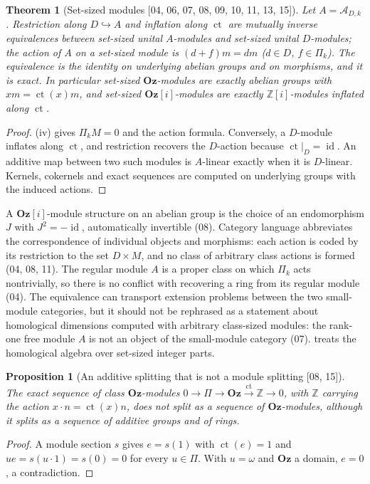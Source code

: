 \documentclass[11pt,letterpaper]{article}
\numberwithin{equation}{section}
\newtheorem{theorem}{Theorem}[section]
\newtheorem{proposition}[proposition]{Proposition}
\theoremstyle{definition}
\theoremstyle{remark}
\theoremstyle{plain}
\newcommand{\Oz}{\mathbf{Oz}}
\newcommand{\GOz}{\Oz[i]}
\newcommand{\Z}{\mathbb Z}
\newcommand{\A}{\mathcal A}          %
\newcommand{\ct}{\operatorname{ct}}
\newcommand{\id}{\operatorname{id}}
\newcommand{\src}[1]{\textup{\textsf{[#1]}}}
\begin{document}
\begin{theorem}[Set-sized modules \src{04, 06, 07, 08, 09, 10, 11, 13, 15}]\label{osq:thm:modules}
Let $A=\A_{D,k}$. Restriction along $D\hookrightarrow A$ and inflation along $\ct$ are mutually
inverse equivalences between set-sized unital $A$-modules and set-sized unital $D$-modules;
the action of $A$ on a set-sized module is $(d+f)m=dm$ ($d\in D$, $f\in\Pi_k$). The
equivalence is the identity on underlying abelian groups and on morphisms, and it is exact.
In particular set-sized $\Oz$-modules are exactly abelian groups with $xm=\ct(x)m$, and
set-sized $\GOz$-modules are exactly $\Z[i]$-modules inflated along $\ct$.
\end{theorem}
\begin{proof}
(iv) gives $\Pi_kM=0$ and the action formula. Conversely, a
$D$-module inflates along $\ct$, and restriction recovers the $D$-action because
$\ct|_D=\id$. An additive map between two such modules is $A$-linear exactly when it is
$D$-linear. Kernels, cokernels and exact sequences are computed on underlying groups with
the induced actions.
\end{proof}

A $\GOz$-module structure on an abelian group is the choice of an endomorphism $J$ with
$J^2=-\id$, automatically invertible (08). Category language abbreviates the correspondence
of individual objects and morphisms: each action is coded by its restriction to the set
$D\times M$, and no class of arbitrary class actions is formed (04, 08, 11). The regular
module $A$ is a proper class on which $\Pi_k$ acts nontrivially, so there is no conflict with
recovering a ring from its regular module (04). The equivalence can transport extension
problems between the two small-module categories, but it should not be rephrased as a
statement about homological dimensions computed with arbitrary class-sized modules: the
rank-one free module $A$ is not an object of the small-module category (07).
 treats the homological algebra over set-sized integer parts.

\begin{proposition}[An additive splitting that is not a module splitting \src{08, 15}]\label{osq:prop:nonsplit}
The exact sequence of class $\Oz$-modules $0\to\Pi\to\Oz\xrightarrow{\ct}\Z\to0$, with
$\Z$ carrying the action $x\cdot n=\ct(x)n$, does not split as a sequence of $\Oz$-modules,
although it splits as a sequence of additive groups and of rings.
\end{proposition}
\begin{proof}
A module section $s$ gives $e=s(1)$ with $\ct(e)=1$ and $ue=s(u\cdot1)=s(0)=0$ for every
$u\in\Pi$. With $u=\omega$ and $\Oz$ a domain, $e=0$, a contradiction.
\end{proof}
\end{document}

